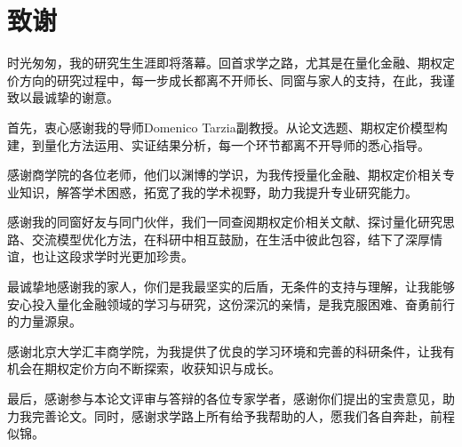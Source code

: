 \chapter{致谢}

时光匆匆，我的研究生生涯即将落幕。回首求学之路，尤其是在量化金融、期权定价方向的研究过程中，每一步成长都离不开师长、同窗与家人的支持，在此，我谨致以最诚挚的谢意。

首先，衷心感谢我的导师Domenico Tarzia副教授。从论文选题、期权定价模型构建，到量化方法运用、实证结果分析，每一个环节都离不开导师的悉心指导。

感谢商学院的各位老师，他们以渊博的学识，为我传授量化金融、期权定价相关专业知识，解答学术困惑，拓宽了我的学术视野，助力我提升专业研究能力。

感谢我的同窗好友与同门伙伴，我们一同查阅期权定价相关文献、探讨量化研究思路、交流模型优化方法，在科研中相互鼓励，在生活中彼此包容，结下了深厚情谊，也让这段求学时光更加珍贵。

最诚挚地感谢我的家人，你们是我最坚实的后盾，无条件的支持与理解，让我能够安心投入量化金融领域的学习与研究，这份深沉的亲情，是我克服困难、奋勇前行的力量源泉。

感谢北京大学汇丰商学院，为我提供了优良的学习环境和完善的科研条件，让我有机会在期权定价方向不断探索，收获知识与成长。

最后，感谢参与本论文评审与答辩的各位专家学者，感谢你们提出的宝贵意见，助力我完善论文。同时，感谢求学路上所有给予我帮助的人，愿我们各自奔赴，前程似锦。